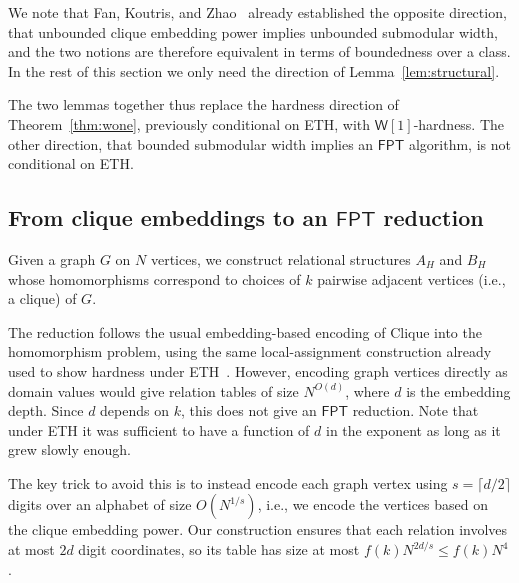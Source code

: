 \documentclass[11pt,letterpaper]{article}
\theoremstyle{definition}
\theoremstyle{remark}
\newcommand{\FPT}{\ensuremath{\mathsf{FPT}}}
\newcommand{\wone}{\ensuremath{\mathsf{W}[1]}}
\providecommand{\FPT}{\ensuremath{\mathsf{FPT}}}
\begin{document}
We note that Fan, Koutris, and Zhao~\cite{stocCliqueEmbedding2023} already established the opposite direction, that unbounded clique embedding power implies unbounded submodular width, and the two notions are therefore equivalent in terms of boundedness over a class. In the rest of this section we only need the direction of Lemma~\ref{lem:structural}.

The two lemmas together thus replace the hardness direction of Theorem~\ref{thm:wone}, previously conditional on ETH, with \wone-hardness. The other direction, that bounded submodular width implies an \FPT{} algorithm, is not conditional on ETH.



\subsection{From clique embeddings to an \FPT{} reduction}
\label{sec:hardness}

Given a graph $G$ on $N$ vertices, we construct relational structures
$A_H$ and $B_H$ whose homomorphisms correspond to choices of $k$ pairwise
adjacent vertices (i.e., a clique) of $G$.
%
%
%
%
%
%

The reduction follows the usual embedding-based encoding of Clique into
the homomorphism problem, using the same local-assignment construction already used to show hardness under ETH~\cite[Lemma 7.5 and Remark 7.6]{Marx13}.
However, encoding graph vertices directly as domain values would give relation
tables of size $N^{O(d)}$, where $d$ is the embedding depth. Since $d$
depends on $k$, this does not give an \FPT{} reduction. Note that under ETH it was sufficient to have a function of $d$ in the exponent as long as it grew slowly enough.

The key trick to avoid this is to instead encode
each graph vertex using $s=\lceil d/2\rceil$ digits over an alphabet of
size $O(N^{1/s})$, i.e., we encode the vertices based on the clique embedding power. Our construction ensures that each relation involves
at most $2d$ digit coordinates, so its table has size at most
$f(k)N^{2d/s}\le f(k)N^4$.
\end{document}
